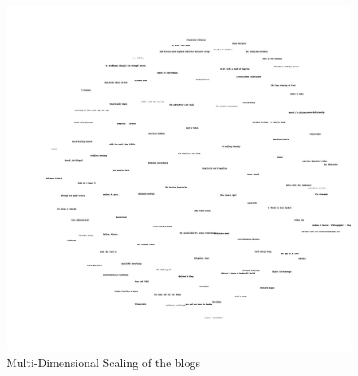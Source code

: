 \begin{figure}
\centering
\includegraphics[width=\textwidth]{../q4/blogs2d}
\caption{Multi-Dimensional Scaling of the blogs}
\end{figure}




